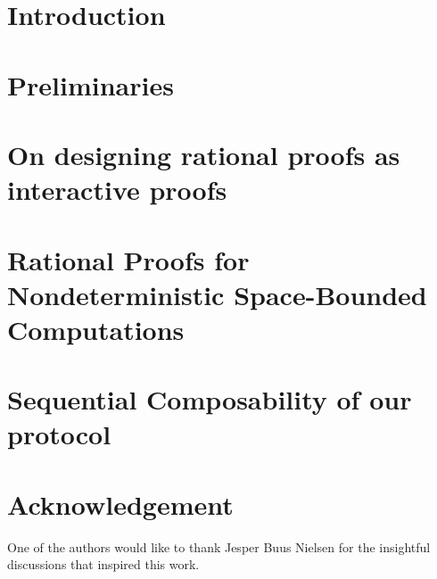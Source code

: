 \documentclass{llncs}
\begin{document}
\section{Introduction}


\section{Preliminaries}


\section{On designing rational proofs as interactive proofs}


\section{Rational Proofs for Nondeterministic Space-Bounded Computations }


\section{Sequential Composability of our protocol}


\section*{Acknowledgement}
One of the authors would like to thank Jesper Buus Nielsen for the insightful discussions that inspired this work.
    


\end{document}
